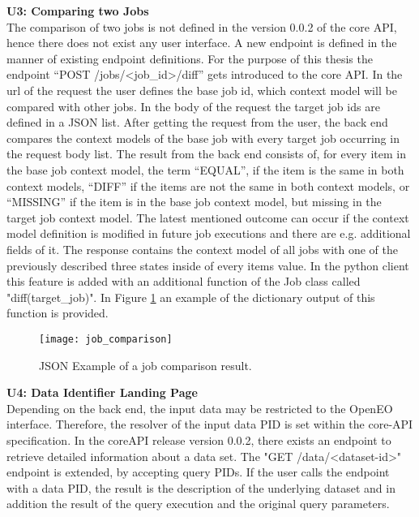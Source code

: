 \documentclass[draft,final]{vutinfth} %
\begin{document}
\textbf{U3: Comparing two Jobs} \\
The comparison of two jobs is not defined in the version 0.0.2 of the core API, hence there does not exist any user interface. A new endpoint is defined in the manner of existing endpoint definitions. For the purpose of this thesis the endpoint  “POST /jobs/<job\_id>/diff” gets introduced to the core API. In the url of the request the user defines the base job id, which context model will be compared with other jobs. In the body of the request the target job ids are defined in a JSON list. After getting the request from the user, the back end compares the context models of the base job with every target job occurring in the request body list. The result from the back end consists of, for every item in the base job context model, the term “EQUAL”, if the item is the same in both context models, “DIFF” if the items are not the same in both context models, or “MISSING” if the item is in the base job context model, but missing in the target job context model. The latest mentioned outcome can occur if the context model definition is modified in future job executions and there are e.g. additional fields of it. The response contains the context model of all jobs with one of the previously described three states inside of every items value. In the python client this feature is added with an additional function of the Job class called "diff(target\_job)". In Figure \ref{fig:job_comparison} an example of the dictionary output of this function is provided.

\begin{figure}[h]
	\centering
	\texttt{[image: job\_comparison]}
	\caption{JSON Example of a job comparison result.}
	\label{fig:job_comparison} %
\end{figure}


\textbf{U4: Data Identifier Landing Page} \\
Depending on the back end, the input data may be restricted to the OpenEO interface. Therefore, the resolver of the input data PID is set within the core-API specification. In the coreAPI release version 0.0.2, there exists an endpoint to retrieve detailed information about a data set. The "GET /data/<dataset-id>" endpoint is extended, by accepting query PIDs. If the user calls the endpoint with a data PID, the result is the description of the underlying dataset and in addition the result of the query execution and the original query parameters.
\end{document}

